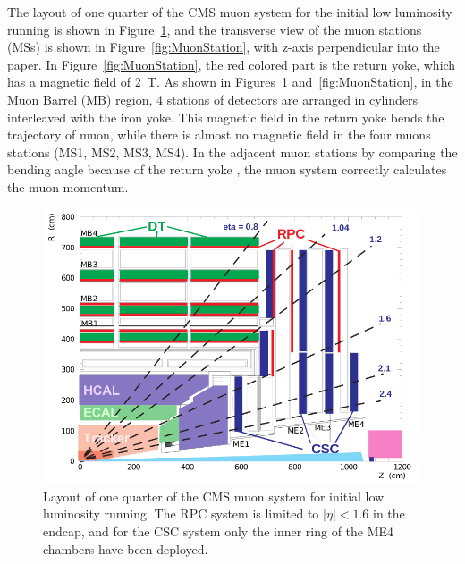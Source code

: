 The layout of one quarter of the CMS muon system for the initial low luminosity running is shown in 
Figure~\ref{fig:Muonsystem},  and the transverse view of the muon stations (MSs) is shown in 
Figure~\ref{fig:MuonStation}, with z-axis perpendicular into the paper. In 
Figure~\ref{fig:MuonStation}, the red colored part is the return yoke, which has a magnetic field of
2~T. As shown in Figures~\ref{fig:Muonsystem} and~\ref{fig:MuonStation},  in the Muon Barrel (MB) region, 4 stations of detectors are arranged in cylinders interleaved with the iron yoke.   
This magnetic field in the return yoke bends the trajectory of muon, while there is almost no magnetic field in the 
four muons stations (MS1, MS2, MS3, MS4). In the adjacent muon stations by comparing the bending angle because of the return yoke , the muon system correctly calculates the muon momentum. 

\begin{figure}
\centering
\includegraphics[width=.8\textwidth]{figures/Muonsystem.png}
\caption{Layout of one quarter of the CMS muon system for initial low luminosity running. The 
RPC system is limited to $|\eta| < 1.6$ in the endcap, and for the CSC system only the inner ring of the ME4 chambers  have been deployed.}
\label{fig:Muonsystem}
\end{figure}

